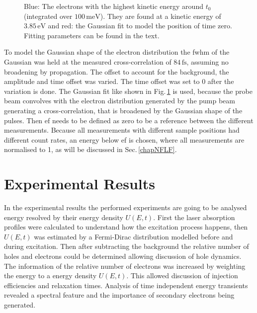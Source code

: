 \documentclass[a4paper,12pt,twoside]{article}
\begin{document}
	\begin{figure}[H]
		\caption{Blue: The electrons with the highest kinetic energy around $t_0$ (integrated over $100\,\mathrm{meV}$). They are found at a kinetic energy of $3.85\,\mathrm{eV}$ and red: the Gaussian fit to model the position of time zero. Fitting parameters can be found in the text.}
	    	\label{timezerofit}
	\end{figure}
\noindent To model the Gaussian shape of the electron distribution the \gls{fwhm} of the Gaussian was held at the measured cross-correlation of $84\,\mathrm{fs}$, assuming no broadening by propagation. The offset to account for the background, the amplitude and time offset was varied. The time offset was set to 0 after the variation is done.
The Gaussian fit like shown in Fig.\,\ref{timezerofit} is used, because the probe beam convolves with the electron distribution generated by the pump beam generating a cross-correlation, that is broadened by the Gaussian shape of the pulses. 
Then \gls{ef} needs to be defined as zero to be a reference between the different measurements. Because all measurements with different sample positions had different count rates, an energy below \gls{ef} is chosen, where all measurements are normalised to 1, as will be discussed in Sec.\,\ref{chapNFLF}.
      
      
\newpage      
\section{Experimental Results}
In the experimental results the performed experiments are going to be analysed energy resolved by their energy density $U(E,t)$. First the laser absorption profiles were calculated to understand how the excitation process happens, then $U(E,t)$ was estimated by a Fermi-Dirac distribution modelled before and during excitation. Then after subtracting the background the relative number of holes and electrons could be determined allowing discussion of hole dynamics. The information of the relative number of electrons was increased by weighting the energy to a energy density $U(E,t)$. This allowed discussion of injection efficiencies and relaxation times. Analysis of time independent energy transients revealed a spectral feature and the importance of secondary electrons being generated.
\end{document}
